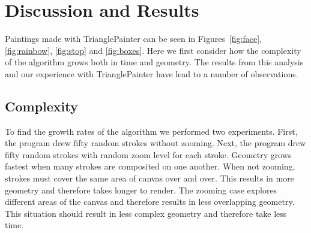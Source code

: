 \documentclass[review]{acmsiggraph}
\begin{document}
\section{Discussion and Results}
Paintings made with TrianglePainter can be seen in Figures~\ref{fig:face}, \ref{fig:rainbow}, \ref{fig:stop} and \ref{fig:boxes}.  Here we first consider how the complexity of the algorithm grows both in time and geometry.
The results from this analysis and our experience with TrianglePainter have lead to a number of observations.

\subsection{Complexity}
To find the growth rates of the algorithm we performed two experiments. 
First, the program drew fifty random strokes without zooming.
Next, the program drew fifty random strokes with random zoom level for each stroke.
Geometry grows fastest when many strokes are composited on one another. When not zooming, strokes
must cover the same area of canvas over and over. This
results in more geometry and therefore takes longer to render. The zooming case explores different
areas of the canvas and therefore results in less overlapping geometry. This situation should result
in less complex geometry and therefore take less time.
\end{document}
